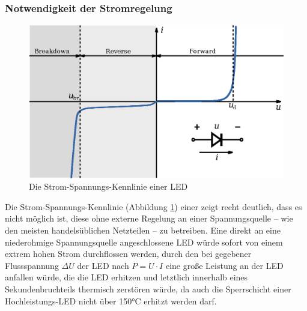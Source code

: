 \documentclass[12pt,a4paper,notitlepage]{article}
\begin{document}
\subsubsection{Notwendigkeit der Stromregelung}
\begin{figure}
\begin{center}
\includegraphics{images/diode-iv-curve_bw.eps}
\caption{Die Strom-Spannungs-Kennlinie einer LED}
\label{diode-iv-curve}
\end{center}
\end{figure}
Die Strom-Spannungs-Kennlinie (Abbildung \ref{diode-iv-curve}) einer  zeigt recht deutlich, dass es nicht möglich ist, diese ohne externe Regelung an einer Spannungsquelle -- wie den meisten handelsüblichen Netzteilen -- zu betreiben. Eine direkt an eine niederohmige Spannungsquelle angeschlossene \gls{LED} würde sofort von einem extrem hohen Strom durchflossen werden, durch den bei gegebener \gls{Flussspannung} $\Delta U$ der \gls{LED} nach $P=U\cdot I$ eine große Leistung an der \gls{LED} anfallen würde, die die \gls{LED} erhitzen und letztlich innerhalb eines Sekundenbruchteils thermisch zerstören würde, da auch die \gls{Sperrschicht} einer Hochleistungs-\gls{LED} nicht über 150°C erhitzt werden darf\cite{PHILIPS1,PHILIPS2}.
\end{document}
